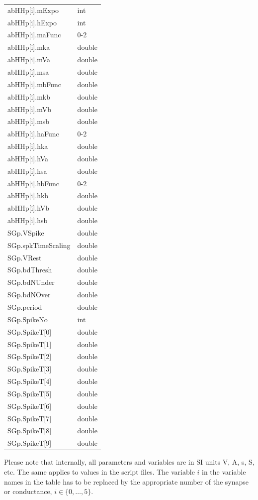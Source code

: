 \documentclass{article}
\begin{document}
\begin{table}
\begin{tabular}[t]{|ll|}
abHHp[i].mExpo & int \\
abHHp[i].hExpo & int \\
abHHp[i].maFunc & 0-2 \\
abHHp[i].mka & double \\
abHHp[i].mVa & double \\
abHHp[i].msa & double \\
abHHp[i].mbFunc & double \\
abHHp[i].mkb & double \\
abHHp[i].mVb & double \\
abHHp[i].msb & double \\
abHHp[i].haFunc & 0-2 \\
abHHp[i].hka & double \\
abHHp[i].hVa & double \\
abHHp[i].hsa & double \\
abHHp[i].hbFunc & 0-2 \\
abHHp[i].hkb & double \\
abHHp[i].hVb & double \\
abHHp[i].hsb & double \\
SGp.VSpike & double \\
SGp.spkTimeScaling & double \\
SGp.VRest & double \\
SGp.bdThresh & double \\
SGp.bdNUnder & double \\
SGp.bdNOver & double \\
SGp.period & double \\ 
SGp.SpikeNo & int \\
SGp.SpikeT[0] & double \\
SGp.SpikeT[1] & double \\
SGp.SpikeT[2] & double \\
SGp.SpikeT[3] & double \\
SGp.SpikeT[4] & double \\
SGp.SpikeT[5] & double \\
SGp.SpikeT[6] & double \\
SGp.SpikeT[7] & double \\
SGp.SpikeT[8] & double \\
SGp.SpikeT[9] & double \\ \hline
\end{tabular}
\end{table}

Please note that internally, all parameters and variables are in SI
units V, A, s, S, etc. The same applies to values in the script files. The variable $i$ in the variable names in the table has to be replaced by the appropriate number of the synapse or conductance, $i \in \{0, \ldots, 5\}$.
\end{document}
